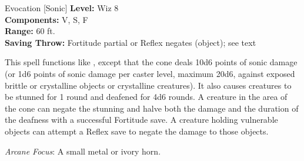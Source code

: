 {Evocation [Sonic]}
{
	\textbf{Level:}
	Wiz 8\\
	\textbf{Components:}
	V, S, F\\
	\textbf{Range:}
	60 ft.\\
	\textbf{Saving Throw:}
	Fortitude partial or Reflex negates (object); see text\\
}
{
	This spell functions like , except that the cone deals 10d6 points of sonic damage (or 1d6 points of sonic damage per caster level, maximum 20d6, against exposed brittle or crystalline objects or crystalline creatures). It also causes creatures to be stunned for 1 round and deafened for 4d6 rounds. A creature in the area of the cone can negate the stunning and halve both the damage and the duration of the deafness with a successful Fortitude save. A creature holding vulnerable objects can attempt a Reflex save to negate the damage to those objects.

	\textit{Arcane Focus}:
	A small metal or ivory horn.

}
